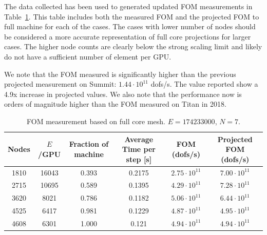 The data collected has been used to generated updated FOM measurements in Table~\ref{tab:FOM}. This table includes both the measured FOM and the projected FOM to full machine for each of the cases. The cases with lower number of nodes should be considered a more accurate representation of full core projections for larger cases. The higher node counts are clearly below the strong scaling limit and likely do not have a sufficient number of element per GPU.

We note that the FOM measured is significantly higher than the previous projected measurement on Summit: $1.44 \cdot 10^{11}$ dofs/s. The value reported show a 4.9x increase in projected values. We also note that the performance now is orders of magnitude higher than the FOM measured on Titan in 2018.


 \begin{table} \centering \small
   \begin{tabular}{cccccc} \hline \hline
    Nodes & $E$/GPU & Fraction of machine & Average Time per step [s] & FOM (dofs/s) & Projected FOM (dofs/s) \\ \hline
    1810 & 	16043 & 0.393 &	0.2175  & $2.75 \cdot 10^{11}$ & $7.00 \cdot 10^{11}$ \\
    2715 &	10695 & 0.589 &	0.1395  & $4.29 \cdot 10^{11}$ & $7.28 \cdot 10^{11}$ \\
    3620 &	8021 & 0.786 &	0.1182  & $5.06 \cdot 10^{11}$ & $6.44 \cdot 10^{11}$ \\
    4525 &	6417 & 0.981 &	0.1229  & $4.87 \cdot 10^{11}$ & $4.95 \cdot 10^{11}$ \\
    4608 &	6301 & 1.000 &	0.121   & $4.94 \cdot 10^{11}$ & $4.94 \cdot 10^{11}$ \\
     \hline \hline
  \end{tabular}
   \caption{FOM measurement based on full core mesh. $E=174233000$, $N=7$.}
   \label{tab:FOM}
  \end{table}


